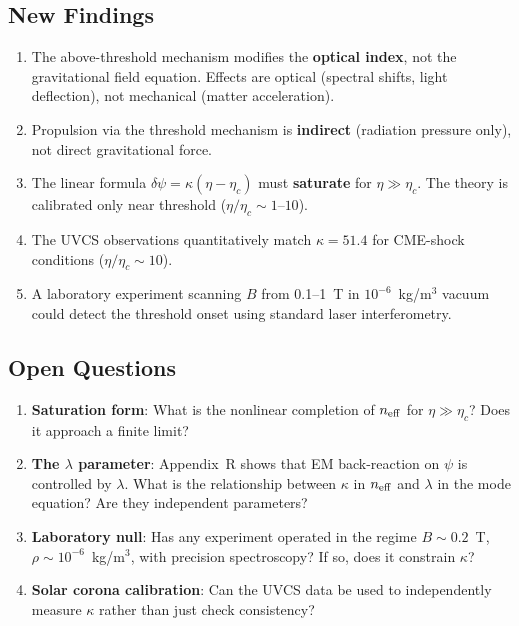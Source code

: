\documentclass[12pt,a4paper]{article}
\theoremstyle{remark}
\begin{document}
\subsection{New Findings}

\begin{enumerate}
\item The above-threshold mechanism modifies the \textbf{optical index},
  not the gravitational field equation. Effects are optical (spectral
  shifts, light deflection), not mechanical (matter acceleration).

\item Propulsion via the threshold mechanism is \textbf{indirect}
  (radiation pressure only), not direct gravitational force.

\item The linear formula $\delta\psi = \kappa(\eta - \eta_c)$ must
  \textbf{saturate} for $\eta \gg \eta_c$. The theory is calibrated
  only near threshold ($\eta/\eta_c \sim 1$--$10$).

\item The UVCS observations quantitatively match $\kappa = 51.4$ for
  CME-shock conditions ($\eta/\eta_c \sim 10$).

\item A laboratory experiment scanning $B$ from 0.1--1~T in
  $10^{-6}$~kg/m$^3$ vacuum could detect the threshold onset using
  standard laser interferometry.
\end{enumerate}

\subsection{Open Questions}

\begin{enumerate}
\item \textbf{Saturation form}: What is the nonlinear completion of
  $n_{\rm eff}$ for $\eta \gg \eta_c$? Does it approach a finite limit?

\item \textbf{The $\lambda$ parameter}: Appendix~R shows that EM
  back-reaction on $\psi$ is controlled by $\lambda$. What is the
  relationship between $\kappa$ in $n_{\rm eff}$ and $\lambda$ in the
  mode equation? Are they independent parameters?

\item \textbf{Laboratory null}: Has any experiment operated in the
  regime $B \sim 0.2$~T, $\rho \sim 10^{-6}$~kg/m$^3$, with precision
  spectroscopy? If so, does it constrain $\kappa$?

\item \textbf{Solar corona calibration}: Can the UVCS data be used to
  independently measure $\kappa$ rather than just check consistency?
\end{enumerate}
\end{document}
